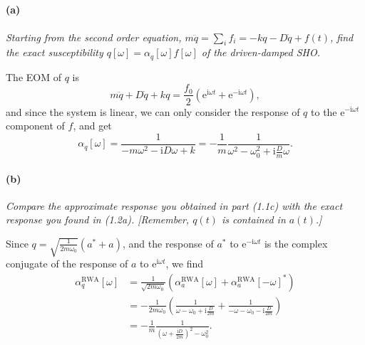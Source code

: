 \documentclass[hyperref, a4paper]{article}
\newcommand*{\ii}{\mathrm{i}}
\newcommand*{\ee}{\mathrm{e}}
\begin{document}
\subsection{}

\paragraph*{(a)}  \textit{
 Starting from the second order equation, $m \ddot{q}=\sum_i f_i=-k q-D \dot{q}+f(t)$, find the exact susceptibility $q[\omega]=\alpha_q[\omega] f[\omega]$ of the driven-damped SHO.   
}

The EOM of $q$ is 
\begin{equation}
    m \ddot{q} + D \dot{q} + k q = \frac{f_0}{2} (\ee^{\ii \omega t} + \ee^{- \ii \omega t}), 
\end{equation}
and since the system is linear, we can only consider 
the response of $q$ to the $\ee^{- \ii \omega t}$ component of $f$, 
and get 
\begin{equation}
    \alpha_q[\omega] = \frac{1}{- m \omega^2 - \ii D \omega + k} 
    = - \frac{1}{m} \frac{1}{\omega^2 - \omega_0^2 + \ii \frac{D}{m} \omega}.
\end{equation}

\paragraph*{(b)} \textit{Compare the approximate response you obtained in part (1.1c) with the exact response you found in (1.2a). [Remember, $q(t)$ is contained in $a(t)$.]} 

Since $q = \sqrt{\frac{1}{2 m \omega_0}} (a^* + a)$, 
and the response of $a^*$ to $\ee^{- \ii \omega t}$ is the complex conjugate 
of the response of $a$ to $\ee^{\ii \omega t}$, 
we find 
\begin{equation}
    \begin{aligned}
    \alpha_q^{\text{RWA}}[\omega] &= \frac{1}{\sqrt{2 m \omega_0}} (
        \alpha_a^{\text{RWA}}[\omega] + 
        \alpha_a^{\text{RWA}}[-\omega]^*
    ) \\
    &= - \frac{1}{2 m \omega_0} \left(
        \frac{1}{\omega - \omega_0 + \ii \frac{D}{2m}} +
        \frac{1}{- \omega - \omega_0 - \ii \frac{D}{2m}}
    \right) \\
    &= - \frac{1}{m} \frac{1}{\left(\omega + \frac{\ii D}{2m}\right)^2 - \omega_0^2}.
    \end{aligned}
\end{equation}
\end{document}
